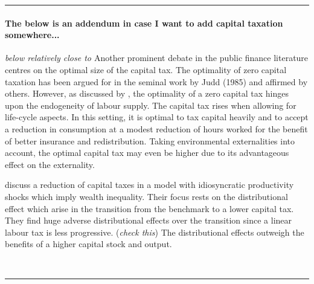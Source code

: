 \noindent\rule[1ex]{\textwidth}{1pt}
\paragraph{The below is an addendum in case I want to add capital taxation somewhere...} \textit{below relatively close to \cite{Conesa2009TaxingAll}} 
Another prominent debate in the public finance literature centres on the optimal size of the capital tax. The optimality of zero capital taxation has been argued for in the seminal work by Judd (1985) and affirmed by others.  However, as discussed by \cite{Conesa2009TaxingAll}, the optimality of a zero capital tax hinges upon the endogeneity of labour supply. The capital tax rises when allowing for life-cycle aspects. In this setting, it is optimal to tax capital heavily and to accept a reduction in consumption at a modest reduction of hours worked for the benefit of better insurance and redistribution. Taking environmental externalities into account, the optimal capital tax may even be higher due to its advantageous effect on the externality.

\cite{Domeij2004OnTaxes} discuss a reduction of capital taxes in a model with idiosyncratic productivity shocks which imply  wealth inequality. Their focus rests on the distributional effect which arise in the transition from the benchmark to a lower capital tax. They find huge adverse distributional effects over the transition since a linear labour tax is less progressive.  (\textit{check this}) The distributional effects outweigh the benefits of a higher capital stock and output. 

\\

\noindent\rule[1ex]{\textwidth}{1pt}

